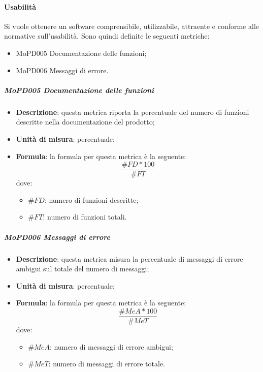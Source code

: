 \documentclass[../norme-di-progetto.tex]{subfiles}
\begin{document}
\paragraph{Usabilità}
Si vuole ottenere un software comprensibile, utilizzabile, attraente e conforme alle normative sull'usabilità. Sono quindi definite le seguenti metriche:
\begin{itemize}
  \item MoPD005 Documentazione delle funzioni;
  \item MoPD006 Messaggi di errore.
\end{itemize}
\subparagraph{MoPD005 Documentazione delle funzioni}
\begin{itemize}
  \item \textbf{Descrizione}: questa metrica riporta la percentuale del numero di funzioni descritte nella documentazione del prodotto;
  \item \textbf{Unità di misura}: percentuale;
  \item \textbf{Formula}: la formula per questa metrica è la seguente:
  \begin{displaymath}
    \frac{\#FD * 100}{\#FT}
  \end{displaymath}
  dove:
  \begin{itemize}
    \item $ \#FD $: numero di funzioni descritte;
    \item $ \#FT $: numero di funzioni totali.
  \end{itemize}
\end{itemize}

\subparagraph{MoPD006 Messaggi di errore}
\begin{itemize}
  \item \textbf{Descrizione}: questa metrica misura la percentuale di messaggi di errore ambigui sul totale del numero di messaggi;
  \item \textbf{Unità di misura}: percentuale;
  \item \textbf{Formula}: la formula per questa metrica è la seguente:
  \begin{displaymath}
    \frac{\#MeA * 100}{\#MeT}
  \end{displaymath}
  dove:
  \begin{itemize}
    \item $ \#MeA $: numero di messaggi di errore ambigui;
    \item $ \#MeT $: numero di messaggi di errore totale.
  \end{itemize}
\end{itemize}
\end{document}
